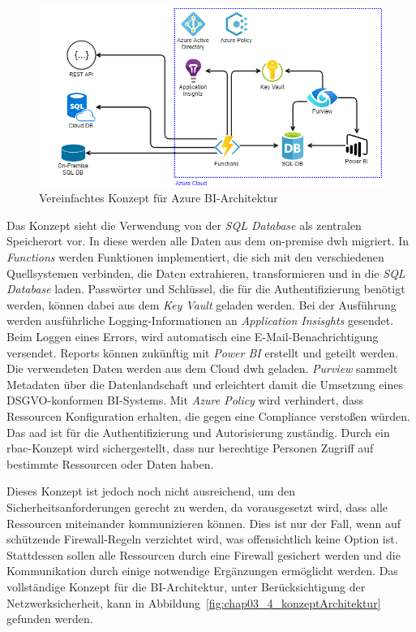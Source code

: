 \begin{figure}[htbp]
 \centering
 \includegraphics[width=\textwidth]{gfx/konzept_1.png}
 \caption{Vereinfachtes Konzept für Azure BI-Architektur}
\label{fig:chap03_4_konzeptArchitektur_offen}
\end{figure}

Das Konzept sieht die Verwendung von der \textit{SQL Database} als zentralen Speicherort vor. In diese werden alle Daten aus dem on-premise \ac{dwh} migriert. In \textit{Functions} werden Funktionen implementiert, die sich mit den verschiedenen Quellsystemen verbinden, die Daten extrahieren, transformieren und in die \textit{SQL Database} laden. Passwörter und Schlüssel, die für die Authentifizierung benötigt werden, können dabei aus dem \textit{Key Vault} geladen werden. Bei der Ausführung werden ausführliche Logging-Informationen an \textit{Application Insisghts} gesendet. Beim Loggen eines Errors, wird automatisch eine E-Mail-Benachrichtigung versendet. Reports können zukünftig mit \textit{Power BI} erstellt und geteilt werden. Die verwendeten Daten werden aus dem Cloud \ac{dwh} geladen. \textit{Purview} sammelt Metadaten über die Datenlandschaft und erleichtert damit die Umsetzung eines DSGVO-konformen BI-Systems. Mit \textit{Azure Policy} wird verhindert, dass Ressourcen Konfiguration erhalten, die gegen eine Compliance verstoßen würden. Das \ac{aad} ist für die Authentifizierung und Autorisierung zuständig. Durch ein \ac{rbac}-Konzept wird sichergestellt, dass nur berechtige Personen Zugriff auf bestimmte Ressourcen oder Daten haben. 

Dieses Konzept ist jedoch noch nicht ausreichend, um den Sicherheitsanforderungen gerecht zu werden, da vorausgesetzt wird, dass alle Ressourcen miteinander kommunizieren können. Dies ist nur der Fall, wenn auf schützende Firewall-Regeln verzichtet wird, was offensichtlich keine Option ist. Stattdessen sollen alle Ressourcen durch eine Firewall gesichert werden und die Kommunikation durch einige notwendige Ergänzungen ermöglicht werden. Das vollständige Konzept für die BI-Architektur, unter Berücksichtigung der Netzwerksicherheit, kann in Abbildung~\ref{fig:chap03_4_konzeptArchitektur} gefunden werden.
 
